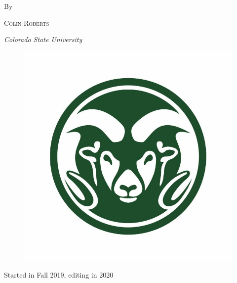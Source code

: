 \begin{titlepage}
	By
	
	\vspace{0.5\baselineskip} %
	
	{\scshape\Large Colin Roberts \\} %
	
	\vspace{0.5\baselineskip} %
	
	\textit{Colorado State University} %
	
	\vfill %
	
	
	\begin{figure}[H]
	    \centering
	    \includegraphics[width=.8\textwidth]{Frontmatter/ram_logo.jpg}
	\end{figure}
	
	\vspace{0.3\baselineskip} %
	
	Started in Fall 2019, editing in 2020 %
	

\end{titlepage}